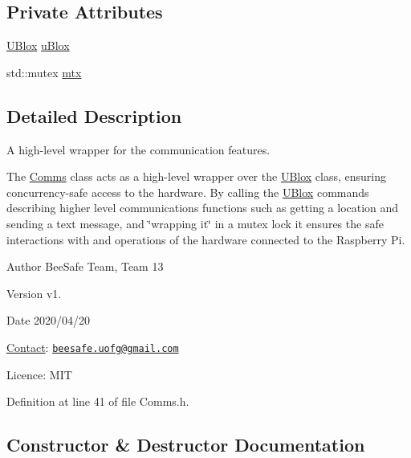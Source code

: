 \subsection*{Private Attributes}
\begin{DoxyCompactItemize}
\item 
\hyperlink{class_u_blox}{U\+Blox} \hyperlink{class_comms_ac64dea134b116147e5441172346dbd6c}{u\+Blox}
\item 
std\+::mutex \hyperlink{class_comms_a21df861b1202573e4cd0cb5666d638fe}{mtx}
\end{DoxyCompactItemize}


\subsection{Detailed Description}
A high-\/level wrapper for the communication features. 

The \hyperlink{class_comms}{Comms} class acts as a high-\/level wrapper over the \hyperlink{class_u_blox}{U\+Blox} class, ensuring concurrency-\/safe access to the hardware. By calling the \hyperlink{class_u_blox}{U\+Blox} commands describing higher level communications functions such as getting a location and sending a text message, and \char`\"{}wrapping it\char`\"{} in a mutex lock it ensures the safe interactions with and operations of the hardware connected to the Raspberry Pi.

\begin{DoxyAuthor}{Author}
Bee\+Safe Team, Team 13
\end{DoxyAuthor}
\begin{DoxyVersion}{Version}
v1.
\end{DoxyVersion}
\begin{DoxyDate}{Date}
2020/04/20
\end{DoxyDate}
\hyperlink{class_contact}{Contact}\+: \href{mailto:beesafe.uofg@gmail.com}{\tt beesafe.\+uofg@gmail.\+com}

Licence\+: M\+IT 

Definition at line 41 of file Comms.\+h.



\subsection{Constructor \& Destructor Documentation}
\mbox{\label{class_comms_aa3878221ed907d6d6841ee77741c1f49}} 
